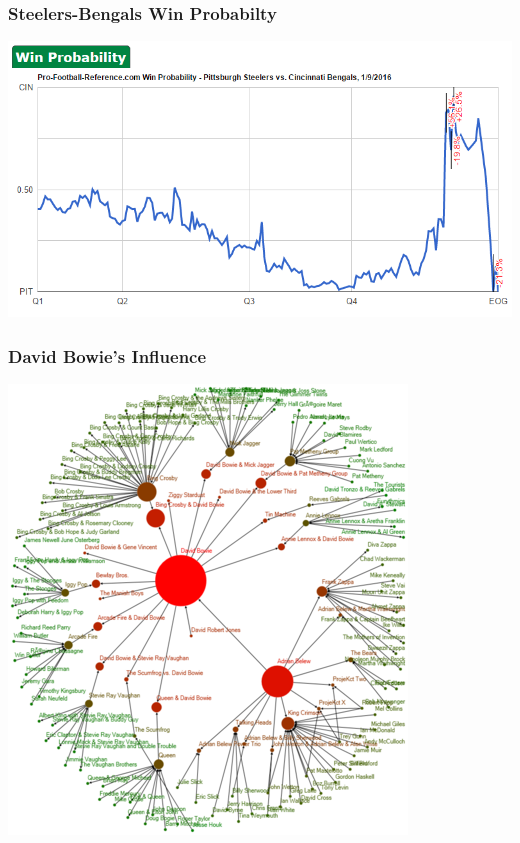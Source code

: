 \documentclass{beamer} %
\begin{document}
\begin{frame}\frametitle{Steelers-Bengals Win Probabilty}
	\centering
	\includegraphics[width=\linewidth]{wp.png}
\end{frame}



\begin{frame}\frametitle{David Bowie's Influence}
	\centering
	\includegraphics[width=0.7\linewidth]{bowie.png}
\end{frame}
\end{document}
